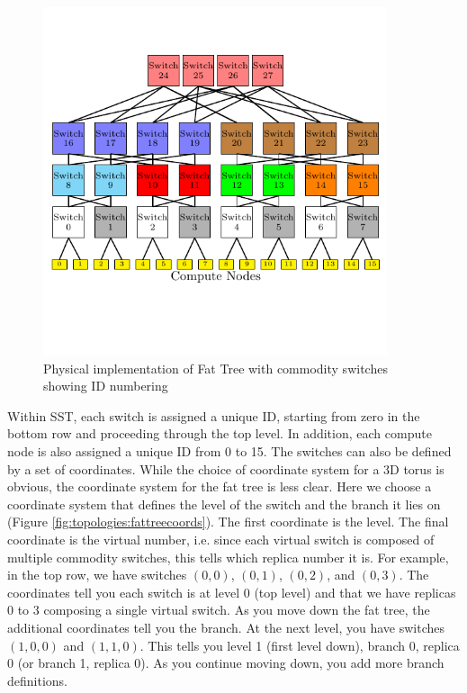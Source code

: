 \begin{figure}[h!]
\centering
\includegraphics[width=0.9\textwidth]{figures/tikz/fattree/fattree_ids.pdf}
\caption{Physical implementation of Fat Tree with commodity switches showing ID numbering}
\label{fig:topologies:fattreeids}
\end{figure}

Within SST, each switch is assigned a unique ID, starting from zero in the bottom row and proceeding through the top level.
In addition, each compute node is also assigned a unique ID from 0 to 15.
The switches can also be defined by a set of coordinates.
While the choice of coordinate system for a 3D torus is obvious, 
the coordinate system for the fat tree is less clear.
Here we choose a coordinate system that defines the level of the switch and the branch it lies on (Figure \ref{fig:topologies:fattreecoords}).
The first coordinate is the level. 
The final coordinate is the virtual number, 
i.e. since each virtual switch is composed of multiple commodity switches,
this tells which replica number it is.
For example, in the top row, we have switches $(0,0)$, $(0,1)$, $(0,2)$, and $(0,3)$.
The coordinates tell you each switch is at level 0 (top level) and that we have replicas 0 to 3 composing a single virtual switch.
As you move down the fat tree, the additional coordinates tell you the branch.
At the next level, you have switches $(1,0,0)$ and $(1,1,0)$.
This tells you level 1 (first level down), branch 0, replica 0 (or branch 1, replica 0).
As you continue moving down, you add more branch definitions.

